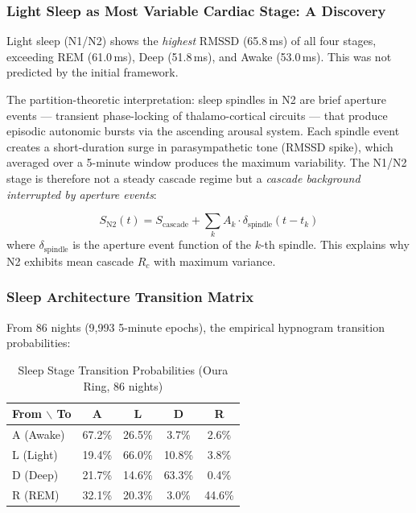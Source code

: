 \documentclass[10pt,twocolumn,a4paper]{article}
\theoremstyle{definition}
\begin{document}
\subsubsection{Light Sleep as Most Variable Cardiac Stage: A Discovery}

Light sleep (N1/N2) shows the \emph{highest} RMSSD (65.8\,ms) of all four
stages, exceeding REM (61.0\,ms), Deep (51.8\,ms), and Awake (53.0\,ms).
This was not predicted by the initial framework.

The partition-theoretic interpretation: sleep spindles in N2 are
brief aperture events --- transient phase-locking of thalamo-cortical
circuits --- that produce episodic autonomic bursts via the
ascending arousal system. Each spindle event creates a short-duration
surge in parasympathetic tone (RMSSD spike), which averaged over a
5-minute window produces the maximum variability. The N1/N2 stage is
therefore not a steady cascade regime but a \emph{cascade background
interrupted by aperture events}:

\begin{equation}
S_{\text{N2}}(t) = S_{\text{cascade}} + \sum_k A_k \cdot \delta_{\text{spindle}}(t - t_k)
\end{equation}
where $\delta_{\text{spindle}}$ is the aperture event function of the $k$-th
spindle. This explains why N2 exhibits mean cascade $R_c$ with maximum variance.

\subsubsection{Sleep Architecture Transition Matrix}

From 86 nights (9,993 5-minute epochs), the empirical hypnogram transition
probabilities:

\begin{table}[H]
\centering
\caption{Sleep Stage Transition Probabilities (Oura Ring, 86 nights)}
\label{tab:transitions}
\begin{tabular}{lcccc}
\toprule
\textbf{From $\backslash$ To} & \textbf{A} & \textbf{L} & \textbf{D} & \textbf{R}\\
\midrule
A (Awake)  & 67.2\% & 26.5\% & 3.7\% & 2.6\%\\
L (Light)  & 19.4\% & 66.0\% & 10.8\% & 3.8\%\\
D (Deep)   & 21.7\% & 14.6\% & 63.3\% & 0.4\%\\
R (REM)    & 32.1\% & 20.3\% & 3.0\% & 44.6\%\\
\bottomrule
\end{tabular}
\end{table}
\end{document}
